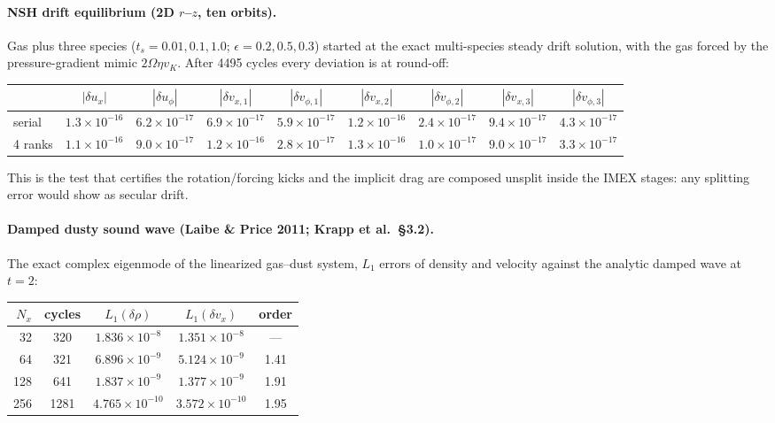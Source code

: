 \documentclass[11pt]{article}
\newcommand{\Om}{\Omega}
\begin{document}
\paragraph{NSH drift equilibrium (2D $r$--$z$, ten orbits).} Gas plus three species
($t_s = 0.01, 0.1, 1.0$; $\epsilon = 0.2, 0.5, 0.3$) started at the exact multi-species
steady drift solution, with the gas forced by the pressure-gradient mimic
$2\Om\eta v_K$. After 4495 cycles every deviation is at round-off:

\begin{center}
\small
\begin{tabular}{@{}lcccccccc@{}}
\toprule
 & $|\delta u_x|$ & $|\delta u_\phi|$ & $|\delta v_{x,1}|$ & $|\delta v_{\phi,1}|$ &
   $|\delta v_{x,2}|$ & $|\delta v_{\phi,2}|$ & $|\delta v_{x,3}|$ & $|\delta v_{\phi,3}|$ \\
\midrule
serial & $1.3\times10^{-16}$ & $6.2\times10^{-17}$ & $6.9\times10^{-17}$ & $5.9\times10^{-17}$ &
  $1.2\times10^{-16}$ & $2.4\times10^{-17}$ & $9.4\times10^{-17}$ & $4.3\times10^{-17}$ \\
4 ranks & $1.1\times10^{-16}$ & $9.0\times10^{-17}$ & $1.2\times10^{-16}$ & $2.8\times10^{-17}$ &
  $1.3\times10^{-16}$ & $1.0\times10^{-17}$ & $9.0\times10^{-17}$ & $3.3\times10^{-17}$ \\
\bottomrule
\end{tabular}
\end{center}

This is the test that certifies the rotation/forcing kicks and the implicit drag are
composed unsplit inside the IMEX stages: any splitting error would show as secular
drift.

\paragraph{Damped dusty sound wave (Laibe \& Price 2011; Krapp et al.\ \S3.2).} The
exact complex eigenmode of the linearized gas--dust system, $L_1$ errors of density
and velocity against the analytic damped wave at $t = 2$:

\begin{center}
\small
\begin{tabular}{@{}rcccc@{}}
\toprule
$N_x$ & cycles & $L_1(\delta\rho)$ & $L_1(\delta v_x)$ & order \\
\midrule
32  & 320  & $1.836\times10^{-8}$  & $1.351\times10^{-8}$ & --- \\
64  & 321  & $6.896\times10^{-9}$  & $5.124\times10^{-9}$ & 1.41 \\
128 & 641  & $1.837\times10^{-9}$  & $1.377\times10^{-9}$ & 1.91 \\
256 & 1281 & $4.765\times10^{-10}$ & $3.572\times10^{-10}$ & 1.95 \\
\bottomrule
\end{tabular}
\end{center}
\end{document}

